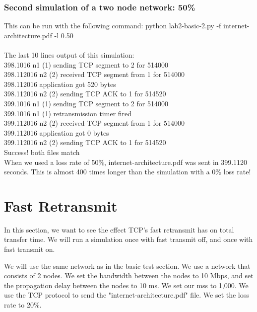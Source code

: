 \documentclass[fleqn,11pt]{article}
\begin{document}
\subsubsection{Second simulation of a two node network: 50\%}
This can be run with the following command: python lab2-basic-2.py -f internet-architecture.pdf -l 0.50\\\\
The last 10 lines output of this simulation:\\
398.1016 n1 (1) sending TCP segment to 2 for 514000\\
398.112016 n2 (2) received TCP segment from 1 for 514000\\
398.112016 application got 520 bytes\\
398.112016 n2 (2) sending TCP ACK to 1 for 514520\\
399.1016 n1 (1) sending TCP segment to 2 for 514000\\
399.1016 n1 (1) retransmission timer fired\\
399.112016 n2 (2) received TCP segment from 1 for 514000\\
399.112016 application got 0 bytes\\
399.112016 n2 (2) sending TCP ACK to 1 for 514520\\
Success! both files match\\

When we used a loss rate of 50\%, internet-architecture.pdf was sent in 399.1120 seconds. This is almost 400 times longer than the simulation with a 0\% loss rate!

\section{Fast Retransmit}
In this section, we want to see the effect TCP's fast retransmit has on total transfer time. We will run a simulation once with fast transmit off, and once with fast transmit on.

We will use the same network as in the basic test section. We use a network that consists of 2 nodes. We set the bandwidth between the nodes to 10 Mbps, and set the propagation delay between the nodes to 10 ms. We set our mss to 1,000. We use the TCP protocol to send the "internet-architecture.pdf" file. We set the loss rate to 20\%.
\end{document}
